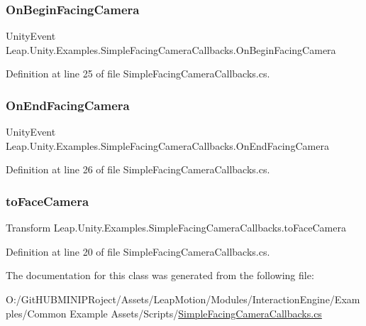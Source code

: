 \subsubsection{\texorpdfstring{OnBeginFacingCamera}{OnBeginFacingCamera}}
{\footnotesize\ttfamily Unity\+Event Leap.\+Unity.\+Examples.\+Simple\+Facing\+Camera\+Callbacks.\+On\+Begin\+Facing\+Camera}



Definition at line 25 of file Simple\+Facing\+Camera\+Callbacks.\+cs.

\mbox{\label{class_leap_1_1_unity_1_1_examples_1_1_simple_facing_camera_callbacks_ac330d8b83831d418193b43e1472b1fc7}} 
\subsubsection{\texorpdfstring{OnEndFacingCamera}{OnEndFacingCamera}}
{\footnotesize\ttfamily Unity\+Event Leap.\+Unity.\+Examples.\+Simple\+Facing\+Camera\+Callbacks.\+On\+End\+Facing\+Camera}



Definition at line 26 of file Simple\+Facing\+Camera\+Callbacks.\+cs.

\mbox{\label{class_leap_1_1_unity_1_1_examples_1_1_simple_facing_camera_callbacks_a3ff7cc54db1b55f4f532941be64f0dbd}} 
\subsubsection{\texorpdfstring{toFaceCamera}{toFaceCamera}}
{\footnotesize\ttfamily Transform Leap.\+Unity.\+Examples.\+Simple\+Facing\+Camera\+Callbacks.\+to\+Face\+Camera}



Definition at line 20 of file Simple\+Facing\+Camera\+Callbacks.\+cs.



The documentation for this class was generated from the following file\+:\begin{DoxyCompactItemize}
\item 
O\+:/\+Git\+H\+U\+B\+M\+I\+N\+I\+P\+Roject/\+Assets/\+Leap\+Motion/\+Modules/\+Interaction\+Engine/\+Examples/\+Common Example Assets/\+Scripts/\mbox{\hyperlink{_simple_facing_camera_callbacks_8cs}{Simple\+Facing\+Camera\+Callbacks.\+cs}}\end{DoxyCompactItemize}
